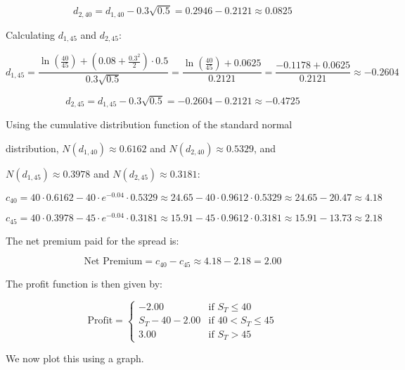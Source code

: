 \documentclass{article}
\begin{document}
\[
d_{2,40} = d_{1,40} - 0.3 \sqrt{0.5} = 0.2946 - 0.2121 \approx 0.0825
\]

Calculating \( d_{1,45} \) and \( d_{2,45} \):

\[
d_{1,45} = \frac{\ln\left(\frac{40}{45}\right) + \left(0.08 + \frac{0.3^2}{2}\right) \cdot 0.5}{0.3 \sqrt{0.5}} = \frac{\ln\left(\frac{40}{45}\right) + 0.0625}{0.2121} = \frac{-0.1178 + 0.0625}{0.2121} \approx -0.2604
\]

\[
d_{2,45} = d_{1,45} - 0.3 \sqrt{0.5} = -0.2604 - 0.2121 \approx -0.4725
\]

\vspace{\baselineskip}

Using the cumulative distribution function of the standard normal 

distribution, \( N(d_{1,40}) \approx 0.6162 \) and \( N(d_{2,40}) \approx 0.5329 \), and 

\( N(d_{1,45}) \approx 0.3978 \) and \( N(d_{2,45}) \approx 0.3181 \):

\[
c_{40} = 40 \cdot 0.6162 - 40 \cdot e^{-0.04} \cdot 0.5329 \approx 24.65 - 40 \cdot 0.9612 \cdot 0.5329 \approx 24.65 - 20.47 \approx 4.18
\]

\[
c_{45} = 40 \cdot 0.3978 - 45 \cdot e^{-0.04} \cdot 0.3181 \approx 15.91 - 45 \cdot 0.9612 \cdot 0.3181 \approx 15.91 - 13.73 \approx 2.18
\]

The net premium paid for the spread is:

\[
\text{Net Premium} = c_{40} - c_{45} \approx 4.18 - 2.18 = 2.00
\]

The profit function is then given by:

\[
\text{Profit} = \begin{cases} 
-2.00 & \text{if } S_T \leq 40 \\
S_T - 40 - 2.00 & \text{if } 40 < S_T \leq 45 \\
3.00 & \text{if } S_T > 45 
\end{cases}
\]

We now plot this using a graph.

\begin{center}
\end{center}
\end{document}
